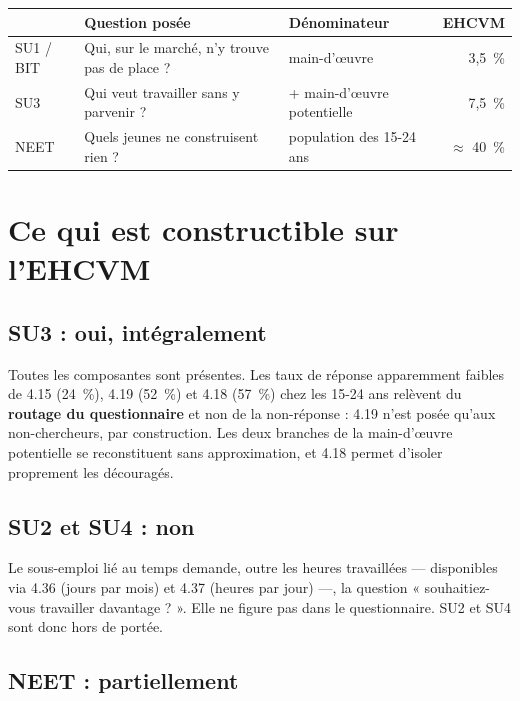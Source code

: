 \documentclass[11pt,a4paper]{article}
\begin{document}
\begin{center}
\small
\begin{tabular}{@{}lll r@{}}
\toprule
& \textbf{Question posée} & \textbf{Dénominateur} & \textbf{EHCVM} \\
\midrule
SU1 / BIT & Qui, sur le marché, n'y trouve pas de place ? & main-d'\oe uvre & 3,5~\% \\
SU3 & Qui veut travailler sans y parvenir ? & + main-d'\oe uvre potentielle & 7,5~\% \\
NEET & Quels jeunes ne construisent rien ? & population des 15-24 ans & $\approx$ 40~\% \\
\bottomrule
\end{tabular}
\end{center}

\section{Ce qui est constructible sur l'EHCVM}

\subsection{SU3 : oui, intégralement}

Toutes les composantes sont présentes. Les taux de réponse apparemment faibles de 4.15 (24~\%),
4.19 (52~\%) et 4.18 (57~\%) chez les 15-24 ans relèvent du \textbf{routage du questionnaire} et
non de la non-réponse : 4.19 n'est posée qu'aux non-chercheurs, par construction. Les deux
branches de la main-d'\oe uvre potentielle se reconstituent sans approximation, et 4.18 permet
d'isoler proprement les découragés.

\subsection{SU2 et SU4 : non}

Le sous-emploi lié au temps demande, outre les heures travaillées --- disponibles via 4.36
(jours par mois) et 4.37 (heures par jour) ---, la question « souhaitiez-vous travailler
davantage ? ». Elle ne figure pas dans le questionnaire. SU2 et SU4 sont donc hors de portée.

\subsection{NEET : partiellement}
\end{document}
